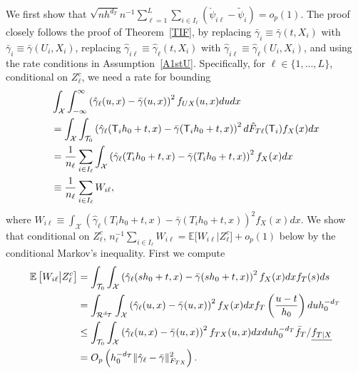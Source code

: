 \documentclass[lettersize, 12pt]{article}
\begin{document}
{We first show that $\sqrt{nh^{d_T}} n^{-1}\sum_{\ell=1}^L\sum_{i\in I_\ell} (\check \psi_{i\ell} - \tilde\psi_i) = o_p(1)$. 
The proof closely follows the proof of Theorem~\ref{TIF}, by replacing $\bar\gamma_i \equiv \bar \gamma(t, X_i)$ with $\bar\gamma_i \equiv \bar \gamma(U_i, X_i)$, replacing $\hat\gamma_{i\ell}\equiv\hat\gamma_{\ell}(t, X_i)$ with $\hat\gamma_{i\ell}\equiv\hat\gamma_\ell(U_i, X_i)$, and using the rate conditions in Assumption~\ref{A1stU}.
Specifically, for $\ell\in\{1,..., L\}$, conditional on $Z_\ell^c$, we need a rate for bounding
\begin{align}
&\int_\mathcal{X}\int_{-\infty}^\infty \left( \hat\gamma_\ell(u,x)-\bar \gamma(u,x)\right)^2 f_{UX}(u,x) dudx 
\notag\\
&= 
 \int_\mathcal{X}\int_{\mathcal{T}_0} \left( \hat\gamma_\ell(\mathsf{T}_i h_0 + t,x)-\bar \gamma(\mathsf{T}_i h_0 + t,x)\right)^2  d\hat F_{T\ell}(\mathsf{T}_i)f_{X}(x) dx 
\notag
\\
&= 
 \frac{1}{n_\ell}\sum_{i\in I_\ell} \int_\mathcal{X} \left( \hat\gamma_\ell({T}_i h_0 + t,x)-\bar \gamma({T}_i h_0 + t,x)\right)^2 f_{X}(x) dx
\notag \\
&\equiv \frac{1}{n_\ell}\sum_{i\in I_\ell} W_{i\ell}, 
\label{1ineq}
\end{align}
where $W_{i\ell} \equiv \int_\mathcal{X} \left( \hat\gamma_\ell({T}_i h_0 + t,x)-\bar \gamma({T}_i h_0 + t,x)\right)^2 f_{X}(x) dx $.
We show that conditional on $Z_\ell^c$, $n_{\ell}^{-1}\sum_{i\in I_\ell} W_{i\ell} = \mathbb{E}\big[W_{i\ell}\big|Z_\ell^c\big]  + o_p(1)$ below by the conditional Markov's inequality.
First we compute 
\begin{align}
\mathbb{E}\left[W_{i\ell}\big|Z_\ell^c\right]
&= \int_{\mathcal{T}_0}\int_\mathcal{X} \left( \hat\gamma_\ell(s h_0 + t,x)-\bar \gamma(s h_0 + t,x)\right)^2 f_{X}(x) dx  f_T(s) ds 
\notag
\\
&=
\int_{\mathcal{R}^{d_T}} \int_\mathcal{X} \left( \hat\gamma_\ell(u,x)-\bar \gamma(u,x)\right)^2 f_{X}(x) dx  f_T\left(\frac{u-t}{h_0}\right) du h_0^{-d_T} 
\notag
\\
&\leq
\int_{\mathcal{T}_0}\int_\mathcal{X} \left( \hat\gamma_\ell(u,x)-\bar \gamma(u,x)\right)^2 f_{TX}(u, x) dx  du h_0^{-d_T} \bar f_T/\underline{f_{T|X}}
\notag
\\
& = O_p\left(h_0^{-d_T}\|\hat\gamma_\ell-\bar\gamma\|_{F_{TX}}^2 \right).
\notag
\end{align}
}
\end{document}
